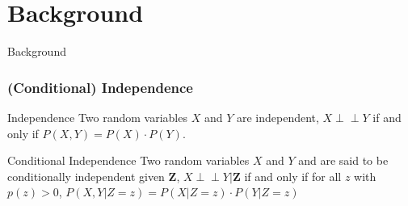 \documentclass{beamer}
\def\ci{\perp\!\!\!\!\!\perp}
\begin{document}
\section{Background}
\begin{frame}
	\begin{center} \Huge{Background} \end{center}
\end{frame}
\begin{frame}
	\frametitle{(Conditional) Independence}
	\begin{block}{Independence}
		Two random variables $ X $ and $ Y $ are independent,
		$ X \ci Y $ if and only if $ P(X, Y) = P(X) \cdot P(Y) $.
	\end{block}
	\vspace{1em}

	\begin{block}{Conditional Independence}
		Two random variables $ X $ and $ Y $ and are said to be
		conditionally independent given $ \bm{Z} $, $ X \ci Y | \bm{Z}
		$ if and only if for all $ z $ with $ p(z) > 0 $, $ P(X, Y |
		Z=z) = P(X | Z=z) \cdot P(Y | Z=z) $
	\end{block}
\end{frame}
\end{document}
